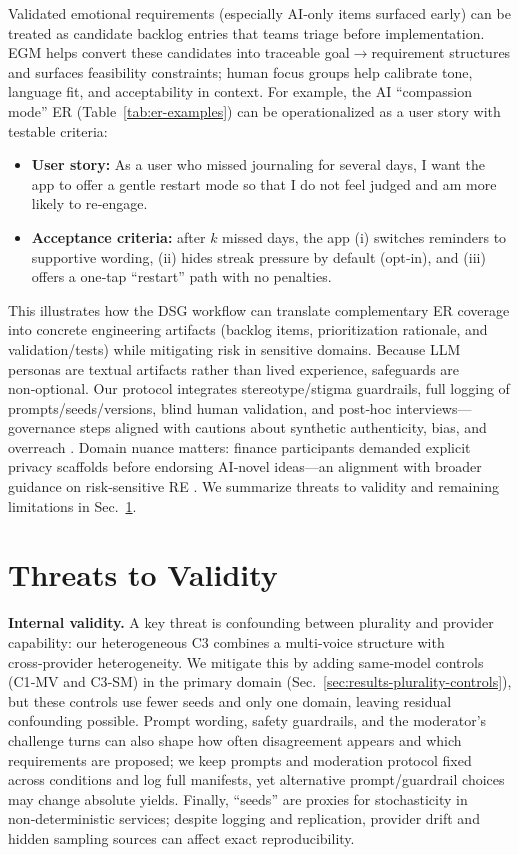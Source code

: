 \documentclass[acmsmall]{acmart}
\begin{document}
Validated emotional requirements (especially AI‑only items surfaced early) can be treated as candidate backlog entries that teams triage before implementation. EGM helps convert these candidates into traceable goal$\rightarrow$requirement structures and surfaces feasibility constraints; human focus groups help calibrate tone, language fit, and acceptability in context. For example, the AI “compassion mode” ER (Table~\ref{tab:er-examples}) can be operationalized as a user story with testable criteria:
\begin{itemize}[leftmargin=1.25em,itemsep=2pt,topsep=2pt]
  \item \textbf{User story:} As a user who missed journaling for several days, I want the app to offer a gentle restart mode so that I do not feel judged and am more likely to re‑engage.
  \item \textbf{Acceptance criteria:} after $k$ missed days, the app (i) switches reminders to supportive wording, (ii) hides streak pressure by default (opt‑in), and (iii) offers a one‑tap “restart” path with no penalties.
\end{itemize}
This illustrates how the DSG workflow can translate complementary ER coverage into concrete engineering artifacts (backlog items, prioritization rationale, and validation/tests) while mitigating risk in sensitive domains. Because LLM personas are textual artifacts rather than lived experience, safeguards are non‑optional. Our protocol integrates stereotype/stigma guardrails, full logging of prompts/seeds/versions, blind human validation, and post‑hoc interviews—governance steps aligned with cautions about synthetic authenticity, bias, and overreach \cite{hulman2023chatgpt,alkhomsan2024eliciting}. Domain nuance matters: finance participants demanded explicit privacy scaffolds before endorsing AI‑novel ideas—an alignment with broader guidance on risk‑sensitive RE \cite{curumsing2014designing}. We summarize threats to validity and remaining limitations in Sec.~\ref{sec:threats}.

\section{Threats to Validity}
\label{sec:threats}
\textbf{Internal validity.}
A key threat is confounding between plurality and provider capability: our heterogeneous C3 combines a multi‑voice structure with cross‑provider heterogeneity. We mitigate this by adding same‑model controls (C1‑MV and C3‑SM) in the primary domain (Sec.~\ref{sec:results-plurality-controls}), but these controls use fewer seeds and only one domain, leaving residual confounding possible. Prompt wording, safety guardrails, and the moderator’s challenge turns can also shape how often disagreement appears and which requirements are proposed; we keep prompts and moderation protocol fixed across conditions and log full manifests, yet alternative prompt/guardrail choices may change absolute yields. Finally, “seeds” are proxies for stochasticity in non‑deterministic services; despite logging and replication, provider drift and hidden sampling sources can affect exact reproducibility.
\end{document}
